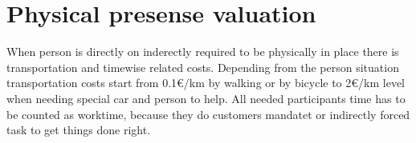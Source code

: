 \section{Physical presense valuation}
\label{valuation_presense}

When person is directly on inderectly required to be physically in place
there is transportation and timewise related costs. Depending from the person
situation transportation costs start from 0.1\euro/km by walking or by
bicycle to 2\euro/km level when needing special car and person to help.
All needed participants time has to be counted as worktime, because they
do customers mandatet or indirectly forced task to get things done right.

